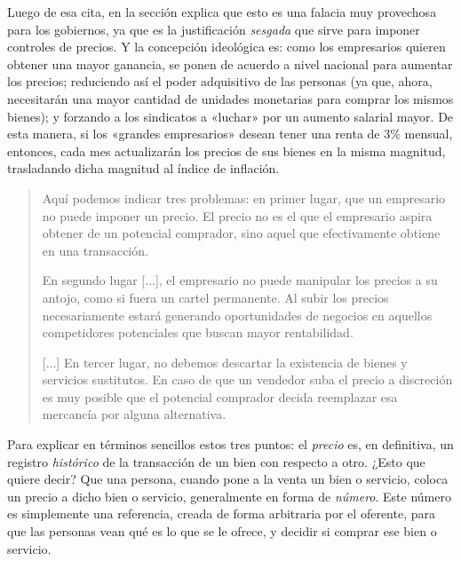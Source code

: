 \documentclass[12pt,a4paper,twoside]{book}
\begin{document}
Luego de esa cita, en la sección explica que esto es una falacia muy provechosa para los gobiernos, ya que es la justificación \textit{sesgada} que sirve para imponer controles de precios. Y la concepción ideológica es: como los empresarios quieren obtener una mayor ganancia, se ponen de acuerdo a nivel nacional para aumentar los precios; reduciendo así el poder adquisitivo de las personas (ya que, ahora, necesitarán una mayor cantidad de unidades monetarias para comprar los mismos bienes); y forzando a los sindicatos a «luchar» por un aumento salarial mayor. De esta manera, si los «grandes empresarios» desean tener una renta de 3\% mensual, entonces, cada mes actualizarán los precios de sus bienes en la misma magnitud, trasladando dicha magnitud al índice de inflación.

\begin{quotation}
Aquí podemos indicar tres problemas: en primer lugar, que un empresario no puede imponer un precio. El precio no es el que el empresario aspira obtener de un potencial comprador, sino aquel que efectivamente obtiene en una transacción.

En segundo lugar [...], el empresario no puede manipular los precios a su antojo, como si fuera un cartel permanente. Al subir los precios necesariamente estará generando oportunidades de negocios en aquellos competidores potenciales que buscan mayor rentabilidad.

[...] En tercer lugar, no debemos descartar la existencia de bienes y servicios sustitutos. En caso de que un vendedor suba el precio a discreción es muy posible que el potencial comprador decida reemplazar esa mercancía por alguna alternativa. \cite[pág. 466-467]{elementos-econopol}
\end{quotation}

Para explicar en términos sencillos estos tres puntos: el \textit{precio} es, en definitiva, un registro \textit{histórico} de la transacción de un bien con respecto a otro. ¿Esto que quiere decir? Que una persona, cuando pone a la venta un bien o servicio, coloca un precio a dicho bien o servicio, generalmente en forma de \textit{número}. Este número es simplemente una referencia, creada de forma arbitraria por el oferente, para que las personas vean qué es lo que se le ofrece, y decidir si comprar ese bien o servicio.
\end{document}
